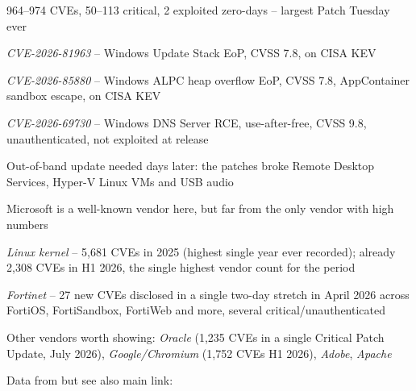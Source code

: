 \documentclass[Screen16to9,17pt]{foils}
\begin{document}
\begin{list2}
\item 964--974 CVEs, 50--113 critical, 2 exploited zero-days -- largest Patch Tuesday ever
\item \emph{CVE-2026-81963} -- Windows Update Stack EoP, CVSS 7.8, on CISA KEV
\item \emph{CVE-2026-85880} -- Windows ALPC heap overflow EoP, CVSS 7.8, AppContainer sandbox escape, on CISA KEV
\item \emph{CVE-2026-69730} -- Windows DNS Server RCE, use-after-free, CVSS 9.8, unauthenticated, not exploited at release\\
\item Out-of-band update needed days later: the patches broke Remote Desktop Services, Hyper-V Linux VMs and USB audio
\end{list2}

\begin{list2}
\item Microsoft is a well-known vendor here, but far from the only vendor with high numbers
\item \emph{Linux kernel} -- 5{,}681 CVEs in 2025 (highest single year ever recorded); already 2{,}308 CVEs in H1 2026, the single highest vendor count for the period\\
\item \emph{Fortinet} -- 27 new CVEs disclosed in a single two-day stretch in April 2026 across FortiOS, FortiSandbox, FortiWeb and more, several critical/unauthenticated\\
\item Other vendors worth showing: \emph{Oracle} (1{,}235 CVEs in a single Critical Patch Update, July 2026), \emph{Google/Chromium} (1{,}752 CVEs H1 2026), \emph{Adobe}, \emph{Apache}
\end{list2}



Data from  but see also main link: 
\end{document}
